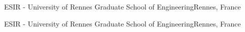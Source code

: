 
{ESIR - University of Rennes Graduate School of Engineering}{Rennes, France}{}

{ESIR - University of Rennes Graduate School of Engineering}{Rennes, France}{}
